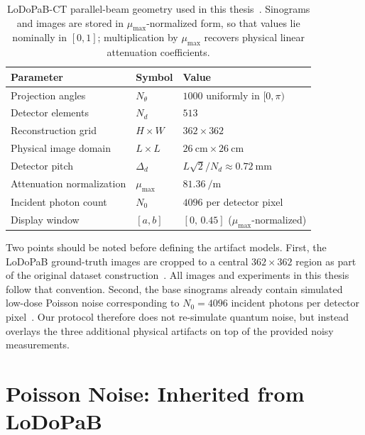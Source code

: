 \begin{table}[!htb]
    \centering
    \caption[LoDoPaB-CT parallel-beam geometry used in this thesis.]{%
        \mbox{LoDoPaB-CT} parallel-beam geometry used in this thesis~\cite{Leuschner2021}. Sinograms and images are stored in $\mu_{\max}$-normalized form, so that values lie nominally in $[0,1]$; multiplication by $\mu_{\max}$ recovers physical linear attenuation coefficients.}
    \label{tab:meth_geometry}
    \begin{tabular}{lll}
        \toprule
        Parameter                           & Symbol         & Value \\
        \midrule
        Projection angles                   & $N_\theta$     & $1000$ uniformly in $[0,\pi)$ \\
        Detector elements                   & $N_d$          & $513$ \\
        Reconstruction grid                 & $H \times W$   & $362 \times 362$ \\
        Physical image domain               & $L \times L$   & $\SI{26}{\centi\metre} \times \SI{26}{\centi\metre}$ \\
        Detector pitch                      & $\Delta_d$     & $L\sqrt{2}/N_d \approx \SI{0.72}{\milli\metre}$ \\
        Attenuation normalization           & $\mu_{\max}$   & $\SI{81.36}{\per\metre}$ \\
        Incident photon count               & $N_0$          & $4096$ per detector pixel \\
        Display window                      & $[a,b]$        & $[0,\,0.45]$ ($\mu_{\max}$-normalized) \\
        \bottomrule
    \end{tabular}
\end{table}

Two points should be noted before defining the artifact models. First, the \mbox{LoDoPaB} ground-truth images are cropped to a central \(362 \times 362\) region as part of the original dataset construction~\cite{Leuschner2021}. All images and experiments in this thesis follow that convention. Second, the base sinograms already contain simulated low-dose Poisson noise corresponding to \(N_0 = 4096\) incident photons per detector pixel~\cite{Leuschner2021}. Our protocol therefore does not re-simulate quantum noise, but instead overlays the three additional physical artifacts on top of the provided noisy measurements.

\section{Poisson Noise: Inherited from LoDoPaB}
\label{sec:meth_poisson}

